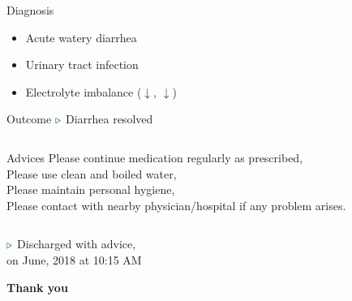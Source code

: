 \documentclass[10pt]{beamer}
\begin{document}
{
\begin{frame}{Diagnosis}
	\begin{itemize}
		\item Acute watery diarrhea
		\item Urinary tract infection
		\item Electrolyte imbalance ($\downarrow$, $\downarrow$)
	\end{itemize}
\end{frame}
}


{
\begin{frame}{Outcome}
	${\color{green}\triangleright}$ Diarrhea resolved\\
	\begin{columns}[T,onlytextwidth]
		\begin{block}{Advices}
			Please continue medication regularly as prescribed, \\
			Please use clean and boiled water, \\
			Please maintain personal hygiene, \\
			Please contact with nearby physician/hospital if any problem arises.
		\end{block}
	\end{columns}
	${\color{green}\triangleright}$ Discharged with advice, \\on {} June, 2018 at 10:15 AM
\end{frame}
}


{%
\begin{frame}{}
	\centering \Huge
	\textbf{Thank you}
\end{frame}
}

\end{document}
